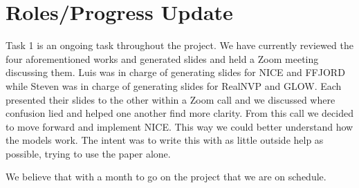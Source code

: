 \section{Roles/Progress Update}
Task 1 is an ongoing task throughout the project. We have currently reviewed the
four aforementioned works and generated slides and held a Zoom meeting
discussing them. Luis was in charge of generating slides for NICE and FFJORD
while Steven was in charge of generating slides for RealNVP and GLOW. Each
presented their slides to the other within a Zoom call and we discussed where
confusion lied and helped one another find more clarity. From this call we
decided to move forward and implement NICE. This way we could better understand
how the models work. The intent was to write this with as little outside help as
possible, trying to use the paper alone.

We believe that with a month to go on the project that we are on schedule.
